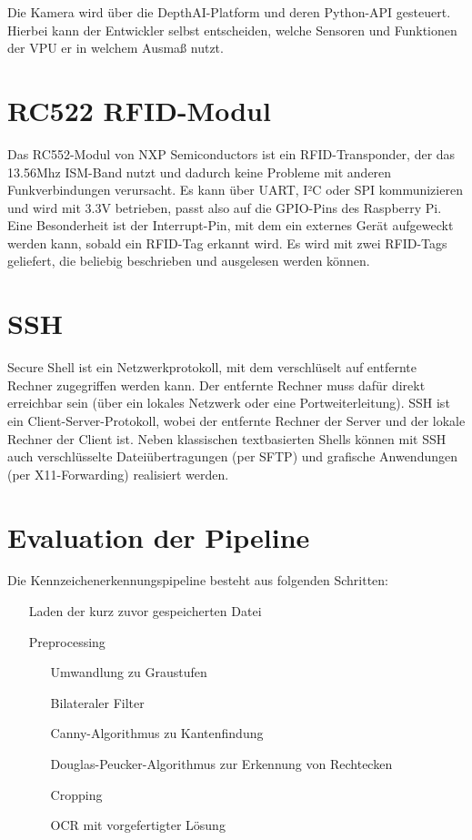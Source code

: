 Die Kamera wird über die DepthAI-Platform und deren Python-API gesteuert. Hierbei kann der Entwickler selbst entscheiden, welche Sensoren und Funktionen der VPU er in welchem Ausmaß nutzt.

\chapter{RC522 RFID-Modul}

Das RC552-Modul von NXP Semiconductors ist ein RFID-Transponder, der das 13.56Mhz ISM-Band nutzt und dadurch keine Probleme mit anderen Funkverbindungen verursacht. Es kann über UART, I²C oder SPI kommunizieren und wird mit 3.3V betrieben, passt also auf die GPIO-Pins des Raspberry Pi. Eine Besonderheit ist der Interrupt-Pin, mit dem ein externes Gerät aufgeweckt werden kann, sobald ein RFID-Tag erkannt wird. Es wird mit zwei RFID-Tags geliefert, die beliebig beschrieben und ausgelesen werden können. 

\chapter{SSH}

Secure Shell ist ein Netzwerkprotokoll, mit dem verschlüselt auf entfernte Rechner zugegriffen werden kann. Der entfernte Rechner muss dafür direkt erreichbar sein (über ein lokales Netzwerk oder eine Portweiterleitung).
SSH ist ein Client-Server-Protokoll, wobei der entfernte Rechner der Server und der lokale Rechner der Client ist. Neben klassischen textbasierten Shells können mit SSH auch verschlüsselte Dateiübertragungen (per SFTP) und grafische Anwendungen (per X11-Forwarding) realisiert werden.

\chapter{Evaluation der Pipeline}

Die Kennzeichenerkennungspipeline besteht aus folgenden Schritten:
\begin{itemize}
    \item[Laden der kurz zuvor gespeicherten Datei]
    \item[Preprocessing]
    \begin{itemize}
        \item[Umwandlung zu Graustufen]
        \item[Bilateraler Filter]
        \item[Canny-Algorithmus zu Kantenfindung]
        \item[Douglas-Peucker-Algorithmus zur Erkennung von Rechtecken]
        \item[Cropping]
        \item[OCR mit vorgefertigter Lösung]
    \end{itemize}
\end{itemize}


